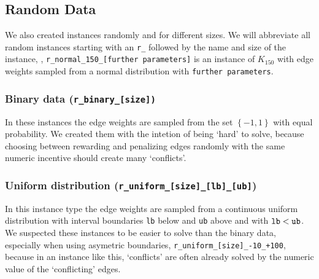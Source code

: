 \subsection{Random Data}\label{subsec:random_data}
We also created \CP instances randomly and for different sizes.
We will abbreviate all random instances starting with an \texttt{r\_} followed by the name and size of the instance,
\eg, \texttt{r\_normal\_150\_[further parameters]} is an instance of $K_{150}$ with edge weights sampled from a normal distribution with \texttt{further parameters}.

\subsubsection{Binary data (\texttt{r\_binary\_[size])}}\label{subsubsec:data_random_binary}
In these instances the edge weights are sampled from the set $\left\{ -1, 1 \right\}$ with equal probability.
We created them with the intetion of being ‘hard’ to solve,
because choosing between rewarding and penalizing edges randomly with the same numeric incentive should create many ‘conflicts’.

\subsubsection{Uniform distribution (\texttt{r\_uniform\_[size]\_[lb]\_[ub]})}\label{subsubsec:data_random_uniform}
In this instance type the edge weights are sampled from a continuous uniform distribution with interval boundaries \texttt{lb} below and \texttt{ub} above and with $\text{\texttt{lb}} < \text{\texttt{ub}}$.
We suspected these instances to be easier to solve than the binary data, especially when using asymetric boundaries, \eg \texttt{r\_uniform\_[size]\_-10\_+100}, because in an instance like this, ‘conflicts’ are often already solved by the numeric value of the ‘conflicting’ edges.

